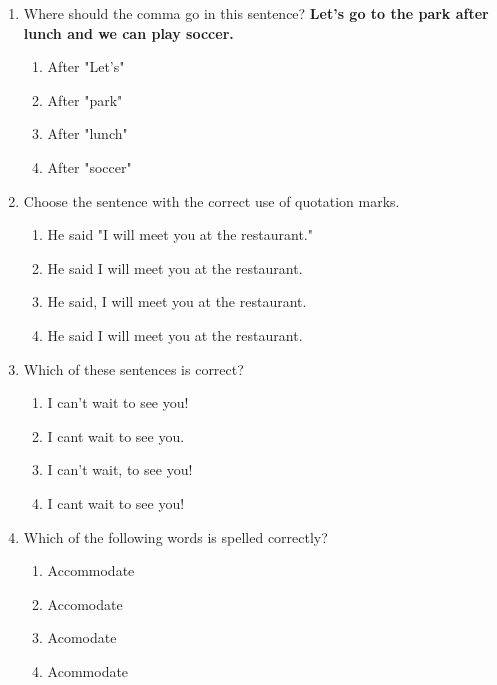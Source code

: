 \documentclass[12pt]{article}
\begin{document}
\begin{enumerate}
\vspace{0.5cm}

\item Where should the comma go in this sentence?
\textbf{Let's go to the park after lunch and we can play soccer.}
\begin{enumerate}[label=\Alph*.]
    \item After "Let's"
    \item After "park"
    \item After "lunch"
    \item After "soccer"
\end{enumerate}

\vspace{0.5cm}

\item Choose the sentence with the correct use of quotation marks.
\begin{enumerate}[label=\Alph*.]
    \item He said "I will meet you at the restaurant."
    \item He said I will meet you at the restaurant.
    \item He said, I will meet you at the restaurant.
    \item He said I will meet you at the restaurant.
\end{enumerate}

\vspace{0.5cm}

\item Which of these sentences is correct?
\begin{enumerate}[label=\Alph*.]
    \item I can’t wait to see you! 
    \item I cant wait to see you.
    \item I can't wait, to see you!
    \item I cant wait to see you!
\end{enumerate}

\vspace{0.5cm}

\item Which of the following words is spelled correctly?
\begin{enumerate}[label=\Alph*.]
    \item Accommodate
    \item Accomodate
    \item Acomodate
    \item Acommodate
\end{enumerate}


\end{enumerate}
\end{document}
